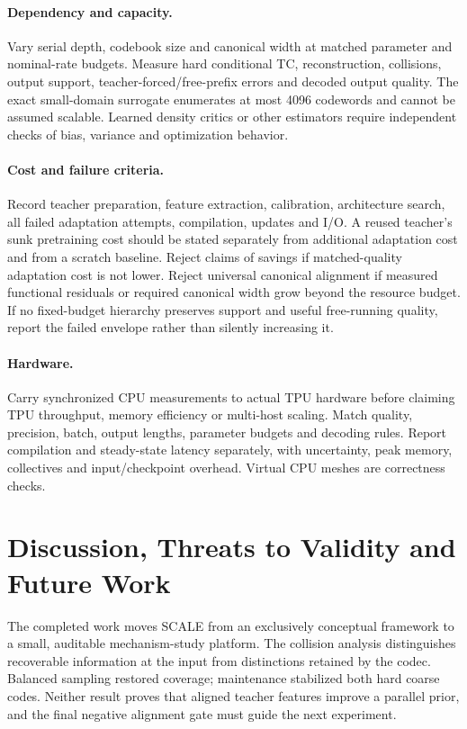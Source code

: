 \documentclass[11pt,a4paper]{article}
\begin{document}
\paragraph{Dependency and capacity.}
Vary serial depth, codebook size and canonical width at matched parameter and
nominal-rate budgets. Measure hard conditional TC, reconstruction, collisions,
output support, teacher-forced/free-prefix errors and decoded output quality.
The exact small-domain surrogate enumerates at most 4096 codewords and cannot
be assumed scalable. Learned density critics or other estimators require
independent checks of bias, variance and optimization behavior.

\paragraph{Cost and failure criteria.}
Record teacher preparation, feature extraction, calibration, architecture search,
all failed adaptation attempts, compilation, updates and I/O. A reused teacher's
sunk pretraining cost should be stated separately from additional adaptation
cost and from a scratch baseline. Reject claims of savings if matched-quality
adaptation cost is not lower. Reject universal canonical alignment if measured
functional residuals or required canonical width grow beyond the resource budget.
If no fixed-budget hierarchy preserves support and useful free-running quality,
report the failed envelope rather than silently increasing it.

\paragraph{Hardware.}
Carry synchronized CPU measurements to actual TPU hardware before claiming TPU
throughput, memory efficiency or multi-host scaling. Match quality, precision,
batch, output lengths, parameter budgets and decoding rules. Report compilation
and steady-state latency separately, with uncertainty, peak memory, collectives
and input/checkpoint overhead. Virtual CPU meshes are correctness checks.

\section{Discussion, Threats to Validity and Future Work}
The completed work moves SCALE from an exclusively conceptual framework to a
small, auditable mechanism-study platform. The collision analysis distinguishes
recoverable information at the input from distinctions retained by the codec.
Balanced sampling restored coverage; maintenance stabilized both hard coarse
codes. Neither result proves that aligned teacher features improve a parallel
prior, and the final negative alignment gate must guide the next experiment.
\end{document}
